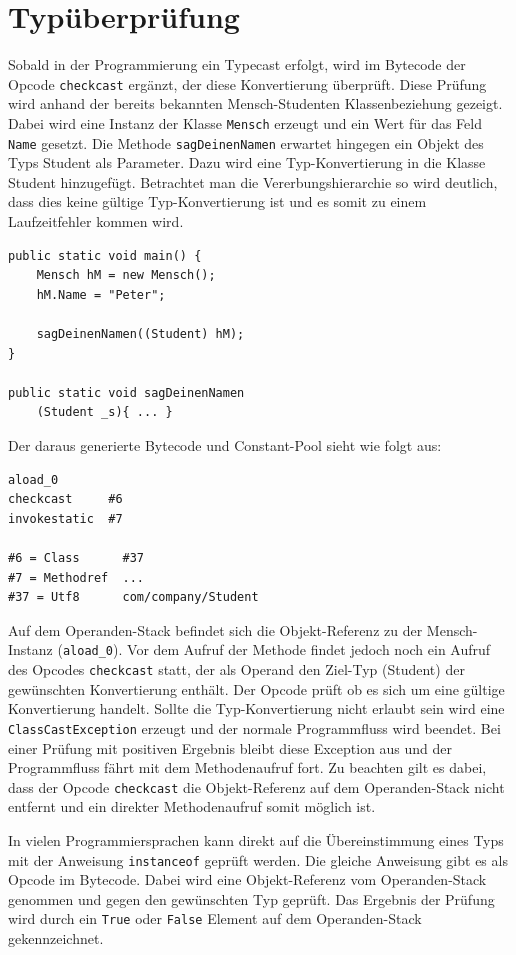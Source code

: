 \documentclass[conference]{IEEEtran}
\begin{document}
\section{Typüberprüfung}
Sobald in der Programmierung ein Typecast erfolgt, wird im Bytecode der Opcode \verb|checkcast| ergänzt, der diese Konvertierung überprüft. Diese Prüfung wird anhand der bereits bekannten Mensch-Studenten Klassenbeziehung gezeigt. Dabei wird eine Instanz der Klasse \verb|Mensch| erzeugt und ein Wert für das Feld \verb|Name| gesetzt. Die Methode \verb|sagDeinenNamen| erwartet hingegen ein Objekt des Typs Student als Parameter. Dazu wird eine Typ-Konvertierung in die Klasse Student hinzugefügt. Betrachtet man die Vererbungshierarchie so wird deutlich, dass dies keine gültige Typ-Konvertierung ist und es somit zu einem Laufzeitfehler kommen wird.
\begin{lstlisting}
public static void main() {
	Mensch hM = new Mensch();
	hM.Name = "Peter";

	sagDeinenNamen((Student) hM);
}

public static void sagDeinenNamen
	(Student _s){ ... }
\end{lstlisting}
Der daraus generierte Bytecode und Constant-Pool sieht wie folgt aus:
\begin{lstlisting}
aload_0
checkcast     #6
invokestatic  #7

#6 = Class      #37
#7 = Methodref  ...
#37 = Utf8      com/company/Student
\end{lstlisting}
Auf dem Operanden-Stack befindet sich die Objekt-Referenz zu der Mensch-Instanz (\verb|aload_0|). Vor dem Aufruf der Methode findet jedoch noch ein Aufruf des Opcodes \verb|checkcast| statt, der als Operand den Ziel-Typ (Student) der gewünschten Konvertierung enthält. Der Opcode prüft ob es sich um eine gültige Konvertierung handelt. Sollte die Typ-Konvertierung nicht erlaubt sein wird eine \verb|ClassCastException| erzeugt und der normale Programmfluss wird beendet. Bei einer Prüfung mit positiven Ergebnis bleibt diese Exception aus und der Programmfluss fährt mit dem Methodenaufruf fort. Zu beachten gilt es dabei, dass der Opcode \verb|checkcast| die Objekt-Referenz auf dem Operanden-Stack nicht entfernt und ein direkter Methodenaufruf somit möglich ist.\cite{Venners.1996}

In vielen Programmiersprachen kann direkt auf die Übereinstimmung eines Typs mit der Anweisung \verb|instanceof| geprüft werden. Die gleiche Anweisung gibt es als Opcode im Bytecode. Dabei wird eine Objekt-Referenz vom Operanden-Stack genommen und gegen den gewünschten Typ geprüft. Das Ergebnis der Prüfung wird durch ein \verb|True| oder \verb|False| Element auf dem Operanden-Stack gekennzeichnet.\cite{Venners.1996}


 
\end{document}
